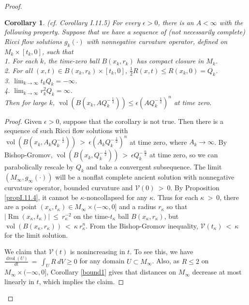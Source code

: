 \documentclass[12pt]{amsart}
\newcommand{\dvol}{\operatorname{dvol}}
\newcommand{\Rm}{\operatorname{Rm}}
\newcommand{\vol}{\operatorname{vol}}
\numberwithin{equation}{section}
\theoremstyle{plain}
\newtheorem{corollary}[equation]{Corollary}
\theoremstyle{definition}
\theoremstyle{remark}
\begin{document}
\begin{proof}
\begin{corollary} (cf. Corollary I.11.5) \label{corI.11.5}
For every $\epsilon > 0$, there is an $A < \infty$ with the following
property.  Suppose that we have a sequence of (not necessarily
complete) Ricci flow solutions $g_k(\cdot)$ with nonnegative
curvature operator, defined on $M_k \times [t_k, 0]$, such that \\
1.  For each $k$, the time-zero ball $B(x_k, r_k)$ has compact closure
in $M_k$. \\
2. For all $(x, t) \in B(x_k, r_k) \times
[t_k, 0]$, $\frac12 R(x,t) \le R(x_k, 0) = Q_k$. \\
3. $\lim_{k \rightarrow \infty} t_k Q_k = - \infty$. \\
4. $\lim_{k \rightarrow \infty} r_k^2 Q_k = \infty$. \\ 
Then for large $k$, $\vol(B(x_k, A Q_k^{- \: \frac12})) \le 
\epsilon (A Q_k^{- \: \frac12})^n$ at time zero.
\end{corollary}
\begin{proof}
Given $\epsilon > 0$, suppose that the corollary is not true.
Then there is a sequence of such Ricci flow solutions with
$\vol(B(x_k, A_k Q_k^{- \: \frac12})) \: > \: \epsilon 
(A_k Q_k^{- \: \frac12})^n$ at time zero, where
 $A_k \rightarrow \infty$.  
 By Bishop-Gromov, $\vol(B(x_k, Q_k^{- \: \frac12})) \: > \: \epsilon 
Q_k^{- \: \frac{n}{2}}$ at time zero, so we can parabolically rescale by
$Q_k$ and take a convergent subsequence. The limit $(M_\infty,
g_\infty(\cdot))$ will be a nonflat complete ancient solution with
nonnegative curvature operator, bounded curvature and
 ${\mathcal V}(0) \: > \: 0$. 
 By Proposition \ref{propI.11.4}, it cannot be $\kappa$-noncollapsed
 for any $\kappa$. 
Thus for each $\kappa \: > \: 0$,
there are a point $(x_\kappa, t_\kappa) \in M_\infty \times (-\infty,0]$ and a radius
$r_\kappa$ so that $|\Rm(x_\kappa, t_\kappa)| \: \le \:
r_\kappa^{-2}$ on the time-$t_\kappa$ ball $B(x_\kappa, r_\kappa)$,
but $\vol(B(x_\kappa, r_\kappa)) \: < \: \kappa \:
r_\kappa^n$. From the Bishop-Gromov inequality,
${\mathcal V}(t_\kappa) \: < \: \kappa$ for the limit solution.

We claim that
${\mathcal V}(t)$ is nonincreasing in $t$. To see this, we have
$\frac{\dvol(U)}{dt} \: = \: \int_U R \: dV  \ge 0$ for any domain $U
\subset M_\infty$.
Also, as $R \le 2$ on $M_\infty \times (-\infty, 0]$, 
Corollary \ref{bound1}
gives that distances on $M_\infty$
decrease at most linearly in $t$,
which implies the claim.


\end{proof}
\end{proof}
\end{document}
